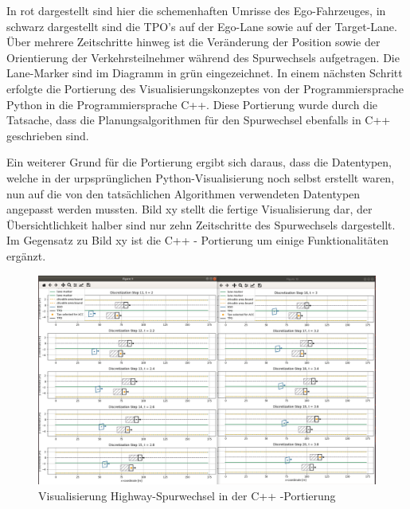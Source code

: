 In rot dargestellt sind hier die schemenhaften Umrisse des Ego-Fahrzeuges, in schwarz dargestellt sind die TPO's auf der Ego-Lane sowie auf der Target-Lane. Über mehrere Zeitschritte hinweg ist die Veränderung der Position sowie der Orientierung der Verkehrsteilnehmer während des Spurwechsels aufgetragen. Die Lane-Marker sind im Diagramm in grün eingezeichnet. 
In einem nächsten Schritt erfolgte die Portierung des Visualisierungskonzeptes von der Programmiersprache Python in die Programmiersprache C++. Diese Portierung wurde durch die Tatsache, dass die Planungsalgorithmen für den Spurwechsel ebenfalls in C++ geschrieben sind.


Ein weiterer Grund für die Portierung ergibt sich daraus, dass die Datentypen, welche in der urpsprünglichen Python-Visualisierung noch selbst erstellt waren, nun auf die von den tatsächlichen Algorithmen verwendeten Datentypen angepasst werden mussten. Bild xy stellt die fertige Visualisierung dar, der Übersichtlichkeit halber sind nur zehn Zeitschritte des Spurwechsels dargestellt. Im Gegensatz zu Bild xy ist die C++ - Portierung um einige Funktionalitäten ergänzt.

\begin{figure}[!ht]
	\begin{center}
		\includegraphics[width=1.0\linewidth]{Abbildungen/bericht/unittest_lc_visu_clion_part1}
		\caption{Visualisierung Highway-Spurwechsel in der C++ -Portierung}
		\label{fig.highway_spurwechsel_clion}
	\end{center}
\end{figure} 

